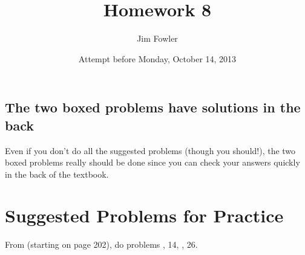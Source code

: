 \documentclass[12pt]{handout}
\title{Homework 8}
\date{Attempt before Monday, October 14, 2013}
\author{Jim Fowler}
\begin{document}
\maketitle










\subsection*{The two boxed problems have solutions in the back}
Even if you don't do all the suggested problems (though you should!), the two boxed problems really should be done since you can check your answers quickly in the back of the textbook.

\section*{Suggested Problems for Practice}

From  (starting on page 202),
do problems , 14, , 26.
\vspace{1ex}
\end{document}

